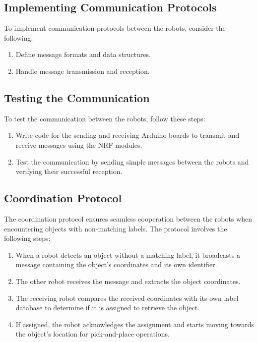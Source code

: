 \documentclass[a4paper,12pt,oneside]{book}
\begin{document}
\subsection*{Implementing Communication Protocols}

To implement communication protocols between the robots, consider the following:

\begin{enumerate}
  \item Define message formats and data structures.
  \item Handle message transmission and reception.
\end{enumerate}

\subsection*{Testing the Communication}

To test the communication between the robots, follow these steps:

\begin{enumerate}
  \item Write code for the sending and receiving Arduino boards to transmit and receive messages using the NRF modules.
  \item Test the communication by sending simple messages between the robots and verifying their successful reception.
\end{enumerate}

\subsection{Coordination Protocol}
The coordination protocol ensures seamless cooperation between the robots when encountering objects with non-matching labels. The protocol involves the following steps:
\begin{enumerate}
  \item When a robot detects an object without a matching label, it broadcasts a message containing the object's coordinates and its own identifier.
  \item The other robot receives the message and extracts the object coordinates.
  \item The receiving robot compares the received coordinates with its own label database to determine if it is assigned to retrieve the object.
  \item If assigned, the robot acknowledges the assignment and starts moving towards the object's location for pick-and-place operations.
\end{enumerate}
\newpage
\end{document}
